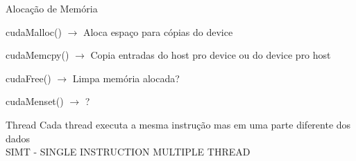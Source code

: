 \begin{frame}[t]{Alocação de Memória}
    \Large{
    \begin{shaded}
        \itemize
        \item cudaMalloc() $\rightarrow$ Aloca espaço para cópias do device\\
        \item cudaMemcpy() $\rightarrow$ Copia entradas do host pro device ou do device pro host\\
        \item cudaFree() $\rightarrow$ Limpa memória alocada?\\
        \item cudaMenset() $\rightarrow$ ?

    \end{shaded}
    }
    
\end{frame}
\begin{frame}[t]{Thread}
    \large
    Cada thread executa a mesma instrução mas em uma parte diferente dos dados\\
    SIMT - SINGLE INSTRUCTION MULTIPLE THREAD
\end{frame}
